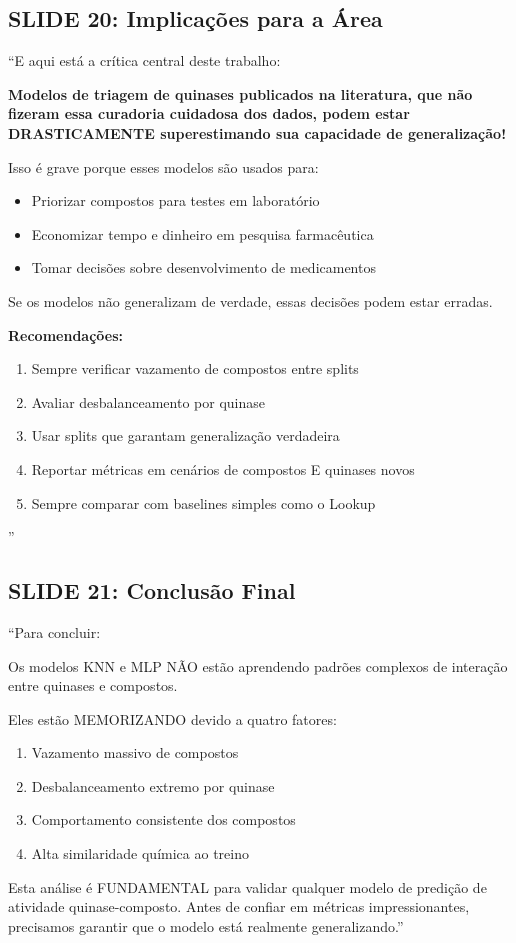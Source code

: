 \documentclass[11pt,a4paper]{article}
\begin{document}
\subsection{SLIDE 20: Implicações para a Área}

\begin{oquedizer}
``E aqui está a crítica central deste trabalho:

\textbf{Modelos de triagem de quinases publicados na literatura, que não fizeram essa curadoria cuidadosa dos dados, podem estar DRASTICAMENTE superestimando sua capacidade de generalização!}

Isso é grave porque esses modelos são usados para:
\begin{itemize}
    \item Priorizar compostos para testes em laboratório
    \item Economizar tempo e dinheiro em pesquisa farmacêutica
    \item Tomar decisões sobre desenvolvimento de medicamentos
\end{itemize}

Se os modelos não generalizam de verdade, essas decisões podem estar erradas.

\textbf{Recomendações:}
\begin{enumerate}
    \item Sempre verificar vazamento de compostos entre splits
    \item Avaliar desbalanceamento por quinase
    \item Usar splits que garantam generalização verdadeira
    \item Reportar métricas em cenários de compostos E quinases novos
    \item Sempre comparar com baselines simples como o Lookup
\end{enumerate}''
\end{oquedizer}

\subsection{SLIDE 21: Conclusão Final}

\begin{oquedizer}
``Para concluir:

Os modelos KNN e MLP NÃO estão aprendendo padrões complexos de interação entre quinases e compostos.

Eles estão MEMORIZANDO devido a quatro fatores:
\begin{enumerate}
    \item Vazamento massivo de compostos
    \item Desbalanceamento extremo por quinase
    \item Comportamento consistente dos compostos
    \item Alta similaridade química ao treino
\end{enumerate}

Esta análise é FUNDAMENTAL para validar qualquer modelo de predição de atividade quinase-composto. Antes de confiar em métricas impressionantes, precisamos garantir que o modelo está realmente generalizando.''
\end{oquedizer}
\end{document}
